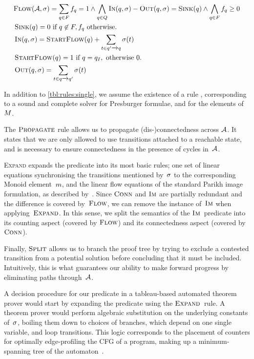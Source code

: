 \documentclass[acmsmall,review,anonymous,screen]{acmart}\settopmatter{printfolios=true,printccs=false,printacmref=true}
\theoremstyle{definition}
\begin{document}
\[
\begin{aligned}
  & \textsc{Flow}(\mathcal{A}, \operatorname{\sigma}) = \sum\limits_{q \in F} f_q = 1 \land \bigwedge\limits_{q \in Q} \operatorname{\textsc{In}}(q, \operatorname{\sigma}) - \operatorname{\textsc{Out}}(q, \operatorname{\sigma}) = \operatorname{\textsc{Sink}}(q) \land
  \bigwedge\limits_{q \in F} f_q \geq 0\\
  & \operatorname{\textsc{Sink}}(q) = 0 \text{ if } q \not\in F, f_q \text{ otherwise.} \\
  & \operatorname{\textsc{In}}(q, \operatorname{\sigma}) = \operatorname{\textsc{StartFlow}}(q) + \sum_{t \in q' \xrightarrow{} q} \operatorname{\sigma}(t)\\
  & \operatorname{\textsc{StartFlow}}(q)  = 1 \text{ if } q = q_I, \text{ otherwise $0$.} \\
  & \operatorname{\textsc{Out}}(q, \operatorname{\sigma}) = \sum_{t \in q \xrightarrow{} q'} \operatorname{\sigma}(t)
\end{aligned}
\]

In addition to \cref{tbl:rules:single}, we assume the existence of a rule
\PresburgerClose{}, corresponding to a sound and complete solver for Presburger
formulae, and for the elements of~$M$.

The $\textsc{Propagate}{}$ rule allows us to propagate (dis-)connectedness across
$\mathcal{A}$. It states that we are only allowed to use transitions attached to
a reachable state, and is necessary to ensure connectedness in the presence of
cycles in~$\mathcal{A}$.

\textsc{Expand} expands the predicate into its most basic rules; one set of
linear equations synchronising the transitions mentioned by~$\operatorname{\sigma}$ to the
corresponding Monoid element~$m$, and the linear flow equations of
the standard Parikh image formulation, as described by~\FlowEq. Since
$\operatorname{\textsc{Conn}}$ and $\operatorname{\textsc{Im}}$ are partially redundant and the difference is covered
by~$\textsc{Flow}$, we can remove the instance of~$\operatorname{\textsc{Im}}$ when applying~$\textsc{Expand}$. In
this sense, we split the semantics of the $\operatorname{\textsc{Im}}$~predicate into its counting
aspect (covered by $\textsc{Flow}$) and its connectedness aspect (covered by
$\operatorname{\textsc{Conn}}$).

Finally, $\textsc{Split}{}$ allows us to branch the proof tree by trying to exclude a
contested transition from a potential solution before concluding that it must be
included. Intuitively, this is what guarantees our ability to make forward
progress by eliminating paths through~$\mathcal{A}$.

A decision procedure for our predicate in a tableau-based automated theorem
prover would start by expanding the predicate using the $\textsc{Expand}{}$~rule. A
theorem prover would perform algebraic substitution on the underlying constants
of~$\operatorname{\sigma}$, boiling them down to choices of branches, which depend on one
single variable, and loop transitions. This logic corresponds to the placement
of counters for optimally edge-profiling the CFG of a program, making up a
minimum-spanning tree of the automaton~\cite{path-profiling}.
\end{document}
